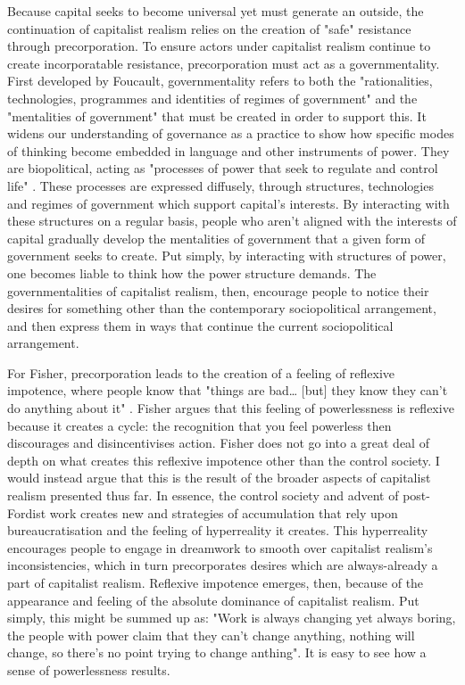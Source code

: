 Because capital seeks to become universal yet must generate an outside, the continuation of capitalist realism relies on the creation of "safe" resistance through precorporation. To ensure actors under capitalist realism continue to create incorporatable resistance, precorporation must act as a governmentality. First developed by Foucault, governmentality refers to both the "rationalities, technologies, programmes and identities of regimes of government" and the "mentalities of government" \citep[24]{dean_governmentality_2010} that must be created in order to support this. It widens our understanding of governance as a practice to show how specific modes of thinking become embedded in language and other instruments of power.  They are biopolitical, acting as "processes of power that seek to regulate and control life" \citep[XX]{lemke_biopolitics:_2011}. These processes are expressed diffusely, through structures, technologies and regimes of government which support capital's interests. By interacting with these structures on a regular basis, people who aren't aligned with the interests of capital gradually develop the mentalities of government that a given form of government seeks to create. Put simply, by interacting with structures of power, one becomes liable to think how the power structure demands. The governmentalities of capitalist realism, then, encourage people to notice their desires for something other than the contemporary sociopolitical arrangement, and then express them in ways that continue the current sociopolitical arrangement. 


For Fisher, precorporation leads to the creation of a feeling of reflexive impotence, where people know that "things are bad\ldots{} [but] they know they can't do anything about it" \citep[24]{fisher_capitalist_2009}. Fisher argues that this feeling of powerlessness is reflexive because it creates a cycle: the recognition that you feel powerless then discourages and disincentivises action. Fisher does not go into a great deal of depth on what creates this reflexive impotence other than the control society. I would instead argue that this is the result of the broader aspects of capitalist realism presented thus far. In essence, the control society and advent of post-Fordist work creates new  and strategies of accumulation that rely upon bureaucratisation and the feeling of hyperreality it creates. This hyperreality encourages people to engage in dreamwork to smooth over capitalist realism's inconsistencies, which in turn precorporates desires which are always-already a part of capitalist realism. Reflexive impotence emerges, then, because of the appearance and feeling of the absolute dominance of capitalist realism. Put simply, this might be summed up as: "Work is always changing yet always boring, the people with power claim that they can't change anything, nothing will change, so there's no point trying to change anthing". It is easy to see how a sense of powerlessness results.

